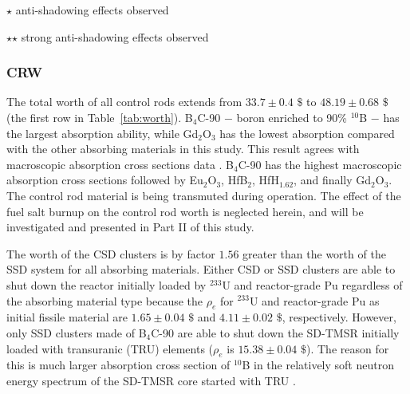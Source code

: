 \begin{sidewaystable}
	\begin{tablenotes}
		\tiny
		\item  $\star$  anti-shadowing effects observed
		\item  $\star$$\star$ strong anti-shadowing effects observed
	\end{tablenotes}
	\label{tab:worth}
\end{sidewaystable}

\subsubsection{CRW} \label{CR_worth}

The total worth of all control rods extends from $33.7\pm0.4$ $\$$ to $48.19\pm0.68$ 
$\$$ (the first row in Table~\ref{tab:worth}). B$_4$C-90 $-$ boron enriched to 90\% $^{10}$B $-$
has the largest absorption ability, while Gd$_2$O$_3$ has the lowest 
absorption compared with the other absorbing materials in this study. This 
result agrees with macroscopic absorption cross sections data 
\cite{guo2019optimized}. B$_4$C-90 has the highest macroscopic 
absorption cross sections followed by Eu$_2$O$_3$, HfB$_2$, HfH$_{1.62}$, and 
finally Gd$_2$O$_3$. The control rod material is being transmuted during 
operation. The effect of the fuel salt burnup on the control rod worth is neglected
herein, and will be investigated and presented in Part II of this 
study.

The worth of the CSD clusters is by factor $1.56$ greater than 
the worth of the SSD system for all absorbing materials. Either CSD or SSD 
clusters are able to shut down the reactor initially loaded by 
$^{233}$U and reactor-grade Pu regardless of the absorbing material type because 
the $\rho_e$ for $^{233}$U and reactor-grade Pu as initial fissile material are $1.65\pm0.04$ 
$\$$ and $4.11\pm0.02$ $\$$, respectively. However, only SSD clusters made of B$_4$C-90 are able to shut down the SD-TMSR 
initially loaded with transuranic (TRU) elements ($\rho_e$ is $15.38\pm0.04$ $\$$). The reason for this is much larger 
absorption cross section of $^{10}$B in the relatively soft neutron energy 
spectrum of the SD-TMSR core started with TRU \cite{ashraf2020Strategies}.

